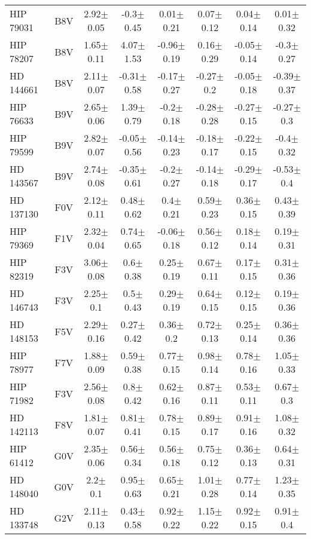 \begin{table}
\begin{center}
\begin{tabular}{l|c|c|c|c|c|c|c}
HIP 79031 & B8V & 2.92$\pm$0.05 & -0.3$\pm$0.45 & 0.01$\pm$0.21 & 0.07$\pm$0.12 & 0.04$\pm$0.14 & 0.01$\pm$0.32 \\
HIP 78207 & B8V & 1.65$\pm$0.11 & 4.07$\pm$1.53 & -0.96$\pm$0.19 & 0.16$\pm$0.29 & -0.05$\pm$0.14 & -0.3$\pm$0.27 \\
HD 144661 & B8V & 2.11$\pm$0.07 & -0.31$\pm$0.58 & -0.17$\pm$0.27 & -0.27$\pm$0.2 & -0.05$\pm$0.18 & -0.39$\pm$0.37 \\
HIP 76633 & B9V & 2.65$\pm$0.06 & 1.39$\pm$0.79 & -0.2$\pm$0.18 & -0.28$\pm$0.28 & -0.27$\pm$0.15 & -0.27$\pm$0.3 \\
HIP 79599 & B9V & 2.82$\pm$0.07 & -0.05$\pm$0.56 & -0.14$\pm$0.23 & -0.18$\pm$0.17 & -0.22$\pm$0.15 & -0.4$\pm$0.32 \\
HD 143567 & B9V & 2.74$\pm$0.08 & -0.35$\pm$0.61 & -0.2$\pm$0.27 & -0.14$\pm$0.18 & -0.29$\pm$0.17 & -0.53$\pm$0.4 \\
HD 137130 & F0V & 2.12$\pm$0.11 & 0.48$\pm$0.62 & 0.4$\pm$0.21 & 0.59$\pm$0.23 & 0.36$\pm$0.15 & 0.43$\pm$0.39 \\
HIP 79369 & F1V & 2.32$\pm$0.04 & 0.74$\pm$0.65 & -0.06$\pm$0.18 & 0.56$\pm$0.12 & 0.18$\pm$0.14 & 0.19$\pm$0.31 \\
HIP 82319 & F3V & 3.06$\pm$0.08 & 0.6$\pm$0.38 & 0.25$\pm$0.19 & 0.67$\pm$0.11 & 0.17$\pm$0.15 & 0.31$\pm$0.36 \\
HD 146743 & F3V & 2.25$\pm$0.1 & 0.5$\pm$0.43 & 0.29$\pm$0.19 & 0.64$\pm$0.15 & 0.12$\pm$0.15 & 0.19$\pm$0.36 \\
HD 148153 & F5V & 2.29$\pm$0.16 & 0.27$\pm$0.42 & 0.36$\pm$0.2 & 0.72$\pm$0.13 & 0.25$\pm$0.14 & 0.36$\pm$0.36 \\
HIP 78977 & F7V & 1.88$\pm$0.09 & 0.59$\pm$0.38 & 0.77$\pm$0.15 & 0.98$\pm$0.14 & 0.78$\pm$0.16 & 1.05$\pm$0.33 \\
HIP 71982 & F3V & 2.56$\pm$0.08 & 0.8$\pm$0.42 & 0.62$\pm$0.16 & 0.87$\pm$0.11 & 0.53$\pm$0.11 & 0.67$\pm$0.3 \\
HD 142113 & F8V & 1.81$\pm$0.07 & 0.81$\pm$0.41 & 0.78$\pm$0.15 & 0.89$\pm$0.17 & 0.91$\pm$0.16 & 1.08$\pm$0.32 \\
HIP 61412 & G0V & 2.35$\pm$0.06 & 0.56$\pm$0.34 & 0.56$\pm$0.18 & 0.75$\pm$0.12 & 0.36$\pm$0.13 & 0.64$\pm$0.31 \\
HD 148040 & G0V & 2.2$\pm$0.1 & 0.95$\pm$0.63 & 0.65$\pm$0.21 & 1.01$\pm$0.28 & 0.77$\pm$0.14 & 1.23$\pm$0.35 \\
HD 133748 & G2V & 2.11$\pm$0.13 & 0.43$\pm$0.58 & 0.92$\pm$0.22 & 1.15$\pm$0.22 & 0.92$\pm$0.15 & 0.91$\pm$0.4 \\

\end{tabular}
\end{center}
\end{table}
